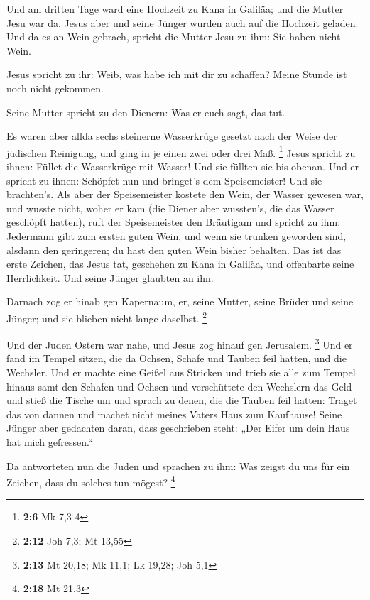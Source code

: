  Und am dritten Tage ward eine Hochzeit zu Kana in Galiläa;
und die Mutter Jesu war da.  Jesus aber und seine Jünger
wurden auch auf die Hochzeit geladen.  Und da es an Wein
gebrach, spricht die Mutter Jesu zu ihm: Sie haben nicht Wein.

 Jesus spricht zu ihr: Weib, was habe ich mit dir zu
schaffen? Meine Stunde ist noch nicht gekommen.

 Seine Mutter spricht zu den Dienern: Was er euch sagt, das
tut.

 Es waren aber allda sechs steinerne Wasserkrüge gesetzt
nach der Weise der jüdischen Reinigung, und ging in je einen zwei oder
drei Maß. \footnote{\textbf{2:6} Mk 7,3-4}  Jesus spricht zu
ihnen: Füllet die Wasserkrüge mit Wasser! Und sie füllten sie bis
obenan.  Und er spricht zu ihnen: Schöpfet nun und bringet's
dem Speisemeister! Und sie brachten's.  Als aber der
Speisemeister kostete den Wein, der Wasser gewesen war, und wusste
nicht, woher er kam (die Diener aber wussten's, die das Wasser geschöpft
hatten), ruft der Speisemeister den Bräutigam  und spricht
zu ihm: Jedermann gibt zum ersten guten Wein, und wenn sie trunken
geworden sind, alsdann den geringeren; du hast den guten Wein bisher
behalten.  Das ist das erste Zeichen, das Jesus tat,
geschehen zu Kana in Galiläa, und offenbarte seine Herrlichkeit. Und
seine Jünger glaubten an ihn.

 Darnach zog er hinab gen Kapernaum, er, seine Mutter,
seine Brüder und seine Jünger; und sie blieben nicht lange daselbst.
\footnote{\textbf{2:12} Joh 7,3; Mt 13,55}

 Und der Juden Ostern war nahe, und Jesus zog hinauf gen
Jerusalem. \footnote{\textbf{2:13} Mt 20,18; Mk 11,1; Lk 19,28; Joh 5,1}
 Und er fand im Tempel sitzen, die da Ochsen, Schafe und
Tauben feil hatten, und die Wechsler.  Und er machte eine
Geißel aus Stricken und trieb sie alle zum Tempel hinaus samt den
Schafen und Ochsen und verschüttete den Wechslern das Geld und stieß die
Tische um  und sprach zu denen, die die Tauben feil hatten:
Traget das von dannen und machet nicht meines Vaters Haus zum Kaufhause!
 Seine Jünger aber gedachten daran, dass geschrieben steht:
„Der Eifer um dein Haus hat mich gefressen.``

 Da antworteten nun die Juden und sprachen zu ihm: Was
zeigst du uns für ein Zeichen, dass du solches tun mögest? \footnote{\textbf{2:18}
  Mt 21,3}

